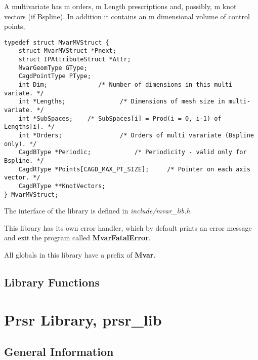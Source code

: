 {A multivariate has m orders, m Length prescriptions and,
possibly, m knot vectors (if Bspline).  In addition it contains
an m dimensional volume of control points,
\begin{verbatim}
typedef struct MvarMVStruct {
    struct MvarMVStruct *Pnext;
    struct IPAttributeStruct *Attr;
    MvarGeomType GType;
    CagdPointType PType;
    int Dim;		      /* Number of dimensions in this multi variate. */
    int *Lengths;               /* Dimensions of mesh size in multi-variate. */
    int *SubSpaces;	   /* SubSpaces[i] = Prod(i = 0, i-1) of Lengths[i]. */
    int *Orders;                /* Orders of multi varariate (Bspline only). */
    CagdBType *Periodic;            /* Periodicity - valid only for Bspline. */
    CagdRType *Points[CAGD_MAX_PT_SIZE];     /* Pointer on each axis vector. */
    CagdRType **KnotVectors;
} MvarMVStruct;
\end{verbatim}

The interface of the library is defined in {\em include/mvar\_lib.h}. 

This library has its own error handler, which by default prints an
error message and exit the program called {\bf MvarFatalError}.

All globals in this library have a prefix of {\bf Mvar}.

\section{Library Functions}


\chapter{Prsr Library, prsr\_lib}

\section{General Information}

}
